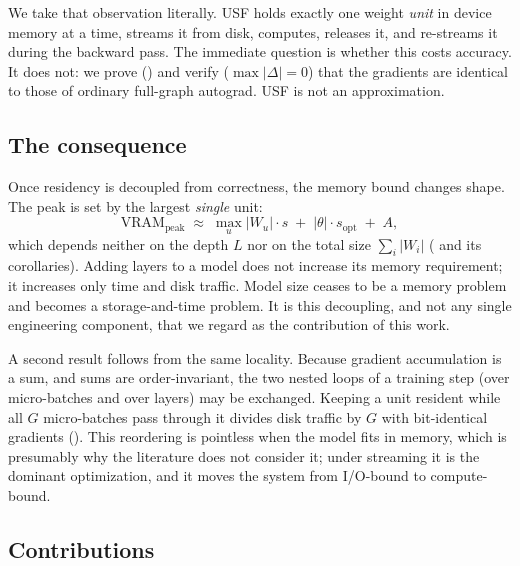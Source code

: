 \documentclass[journal]{IEEEtran}
\newcommand{\usf}{USF}
\newcommand{\Wu}{\lvert W_u \rvert}
\begin{document}
We take that observation literally. \usf{} holds exactly one weight \emph{unit} in device memory at
a time, streams it from disk, computes, releases it, and re-streams it during the backward pass.
The immediate question is whether this costs accuracy. It does not: we prove
() and verify ($\max|\Delta|=0$) that the gradients are identical to those of
ordinary full-graph autograd. \usf{} is not an approximation.

\subsection{The consequence}

Once residency is decoupled from correctness, the memory bound changes shape. The peak is set by
the largest \emph{single} unit:
\begin{equation}
\label{eq:headline}
\mathrm{VRAM}_{\text{peak}} \;\approx\; \max_u \Wu \cdot s \;+\; |\theta|\cdot s_{\text{opt}} \;+\; A ,
\end{equation}
which depends neither on the depth $L$ nor on the total size $\sum_i |W_i|$
( and its corollaries). Adding layers to a model does not increase its memory
requirement; it increases only time and disk traffic. Model size ceases to be a memory problem and
becomes a storage-and-time problem. It is this decoupling, and not any single engineering
component, that we regard as the contribution of this work.

A second result follows from the same locality. Because gradient accumulation is a sum, and sums
are order-invariant, the two nested loops of a training step (over micro-batches and over
layers) may be exchanged. Keeping a unit resident while all $G$ micro-batches pass through it
divides disk traffic by $G$ with bit-identical gradients (). This reordering is
pointless when the model fits in memory, which is presumably why the literature does not consider
it; under streaming it is the dominant optimization, and it moves the system from I/O-bound to
compute-bound.

\subsection{Contributions}
\end{document}
